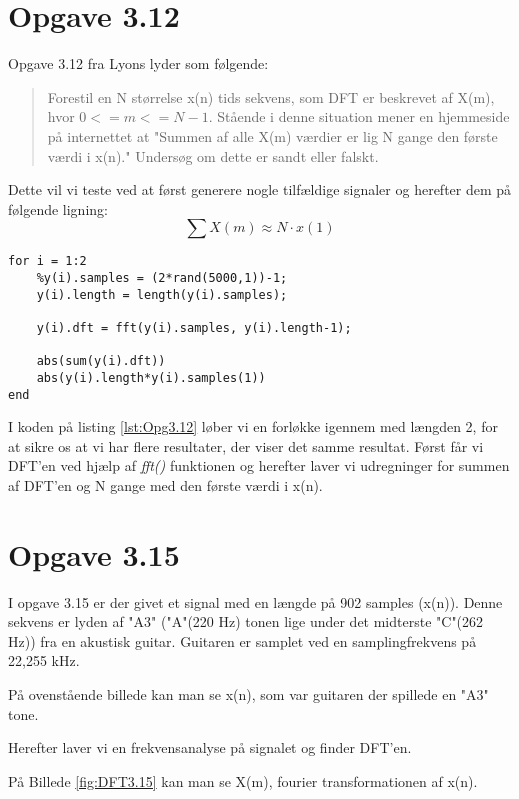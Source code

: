 \documentclass[../main.tex]{subfiles}
\begin{document}
\section{Opgave 3.12}
Opgave 3.12 fra Lyons lyder som følgende:
\begin{quote}
    Forestil en N størrelse x(n) tids sekvens, som DFT er beskrevet af X(m), hvor $0 <= m <= N-1$. 
    Stående i denne situation mener en hjemmeside på internettet at "Summen af alle X(m) værdier er lig N gange den første værdi i x(n)." 
    Undersøg om dette er sandt eller falskt.
\end{quote}

Dette vil vi teste ved at først generere nogle tilfældige signaler og herefter dem på følgende ligning:
\[
    \sum X(m) \approx N \cdot x(1)    
\]

\begin{lstlisting}[caption=MatLab kode til udregning af problematikken fra 3.12, label=lst:Opg3.12]
for i = 1:2
    %y(i).samples = (2*rand(5000,1))-1;
    y(i).length = length(y(i).samples);
    
    y(i).dft = fft(y(i).samples, y(i).length-1);
    
    abs(sum(y(i).dft))
    abs(y(i).length*y(i).samples(1))
end    
\end{lstlisting}

I koden på listing \ref{lst:Opg3.12} løber vi en forløkke igennem med længden 2, for at sikre os at vi har flere resultater, der viser det samme resultat.
Først får vi DFT'en ved hjælp af \textit{fft()} funktionen og herefter laver vi udregninger for summen af DFT'en og N gange med den første værdi i x(n).

\section{Opgave 3.15}
I opgave 3.15 er der givet et signal med en længde på 902 samples (x(n)). Denne sekvens er lyden af "A3" ("A"(220 Hz) tonen lige under det midterste "C"(262 Hz)) fra en akustisk guitar. 
Guitaren er samplet ved en samplingfrekvens på 22,255 kHz.

På ovenstående billede kan man se x(n), som var guitaren der spillede en "A3" tone.

Herefter laver vi en frekvensanalyse på signalet og finder DFT'en.

På Billede \ref{fig:DFT3.15} kan man se X(m), fourier transformationen af x(n).
\end{document}
